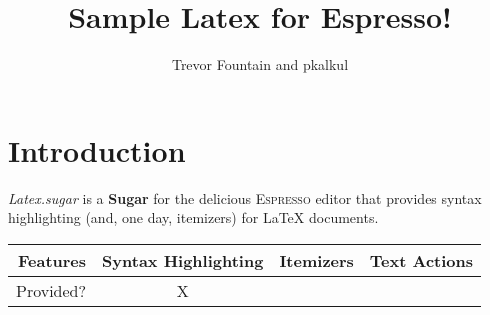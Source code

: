 \documentclass[10pt,twocolumn]{article}
\title{Sample Latex for Espresso!}
\author{Trevor Fountain and pkalkul}
\begin{document}
\maketitle

\section{Introduction}

\emph{Latex.sugar} is a \textbf{Sugar} for the delicious \textsc{Espresso} editor that provides syntax highlighting (and, one day, itemizers) for LaTeX documents.

\begin{table}[h!]
\begin{tabular}{r|c c c}
\textbf{Features} & Syntax Highlighting & Itemizers & Text Actions \\ \hline
Provided? & X & &
\end{tabular}
\end{table}
\end{document}
